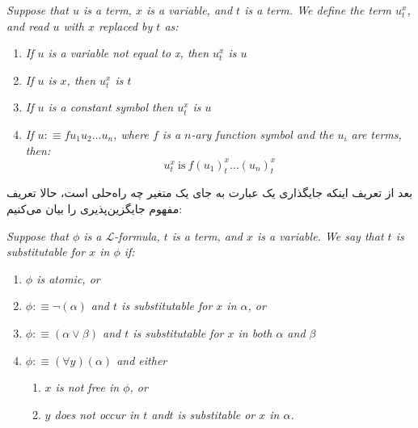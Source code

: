 \documentclass[10pt,a4paper]{article}
\newcommand{\curveL}{\mathcal{L}}
\begin{document}
                    \begin{define}
                        \textit{Suppose that $u$ is a term, $x$ is a variable, and $t$ is a term. We define the term $u_t^x$, and read $u$ with $x$ replaced by $t$ as:}
                        \begin{enumerate}
                            \item \textit{If $u$ is a variable not equal to x, then $u_t^x$ is $u$}
                            \item \textit{If $u$ is $x$, then $u_t^x$ is $t$}
                            \item \textit{If $u$ is a constant symbol then $u_t^x$ is $u$}
                            \item \textit{If $u:\equiv fu_1u_2\dots u_n$, where $f$ is a $n$-ary function symbol and the $u_i$ are terms, then:}
                            \begin{equation}
                                u_t^x \ \text{is} \ f(u_1)_t^x\dots(u_n)_t^x
                            \end{equation}
                        \end{enumerate}
                    \end{define}
بعد از تعریف اینکه جایگذاری یک عبارت به جای یک متغیر چه راه‌حلی است، حالا تعریف مفهوم جایگزین‌پذیری را بیان می‌کنیم:
                    \begin{define}
                        \textit{Suppose that $\phi$ is a $\curveL$-formula, $t$ is a term, and $x$ is a variable. We say that $t$ is substitutable for $x$ in $\phi$ if:}
                        \begin{enumerate}
                            \item \textit{$\phi$ is atomic, or}
                            \item \textit{$\phi :\equiv \neg(\alpha)$ and $t$ is substitutable for $x$ in $\alpha$, or}
                            \item \textit{$\phi:\equiv (\alpha\lor\beta)$ and $t$ is substitutable for $x$ in both $\alpha$ and $\beta$}
                            \item \textit{$\phi:\equiv (\forall y)(\alpha)$ and either}
                            \begin{enumerate}
                                \item \textit{$x$ is not free in $\phi$, or}
                                \item \textit{$y$ does not occur in $t$ and$t$ is substitable or $x$ in $\alpha$.}
                            \end{enumerate}
                        \end{enumerate}
                    \end{define}
\end{document}
